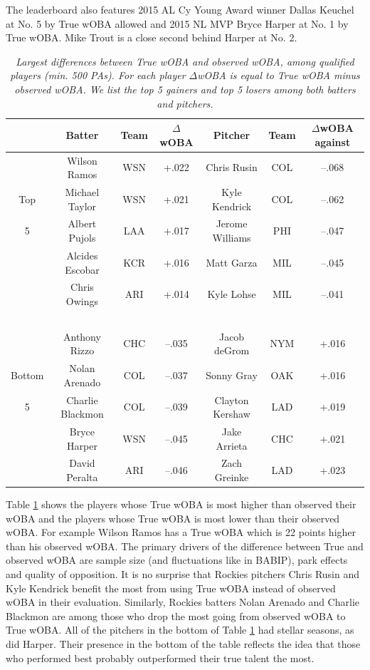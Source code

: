 \documentclass[11pt]{article}
\begin{document}
The leaderboard also features 2015 AL Cy Young Award winner Dallas Keuchel at
No. 5 by True wOBA allowed and 2015 NL MVP Bryce Harper at No. 1 by True wOBA.
Mike Trout is a close second behind Harper at No. 2.

\begin{table}[h]
\caption{\it Largest differences between True wOBA and observed wOBA, among
    qualified players (min. 500 PAs). For each player $\Delta$wOBA is equal to
    True wOBA minus observed wOBA. We list the top 5 gainers and top 5 losers
    among both batters and pitchers.}
\centering
\footnotesize
\begin{tabular}{cccc||ccc}
&Batter             &Team& $\Delta$wOBA& Pitcher   &Team&$\Delta$wOBA against\\
\hline
&Wilson Ramos       &WSN & +.022 & Chris Rusin      &COL &--.068\\
Top&Michael Taylor  &WSN & +.021 & Kyle Kendrick    &COL &--.062\\
5&Albert Pujols     &LAA & +.017 & Jerome Williams  &PHI &--.047\\
&Alcides Escobar    &KCR & +.016 & Matt Garza       &MIL &--.045\\
&Chris Owings       &ARI & +.014 & Kyle Lohse       &MIL &--.041\\
~\\
&Anthony Rizzo      &CHC &--.035 & Jacob deGrom     &NYM & +.016\\
Bottom&Nolan Arenado&COL &--.037 & Sonny Gray       &OAK & +.016\\
5&Charlie Blackmon  &COL &--.039 & Clayton Kershaw  &LAD & +.019\\
&Bryce Harper       &WSN &--.045 & Jake Arrieta     &CHC & +.021\\
&David Peralta      &ARI &--.046 & Zach Greinke     &LAD & +.023
\end{tabular}
\label{tab-delta}
\end{table}

Table \ref{tab-delta} shows the players whose True wOBA is most higher than
observed their wOBA and the players whose True wOBA is most lower than their
observed wOBA. For example Wilson Ramos has a True wOBA which is 22 points
higher than his observed wOBA. The primary drivers of the difference between
True and observed wOBA are sample size (and fluctuations like in BABIP), park
effects and quality of opposition. It is no surprise that Rockies pitchers
Chris Rusin and Kyle Kendrick benefit the most from using True wOBA instead of
observed wOBA in their evaluation. Similarly, Rockies batters Nolan Arenado and
Charlie Blackmon are among those who drop the most going from observed wOBA to
True wOBA. All of the pitchers in the bottom of Table \ref{tab-delta} had
stellar seasons, as did Harper. Their presence in the bottom of the table
reflects the idea that those who performed best probably outperformed their
true talent the most.
\end{document}
